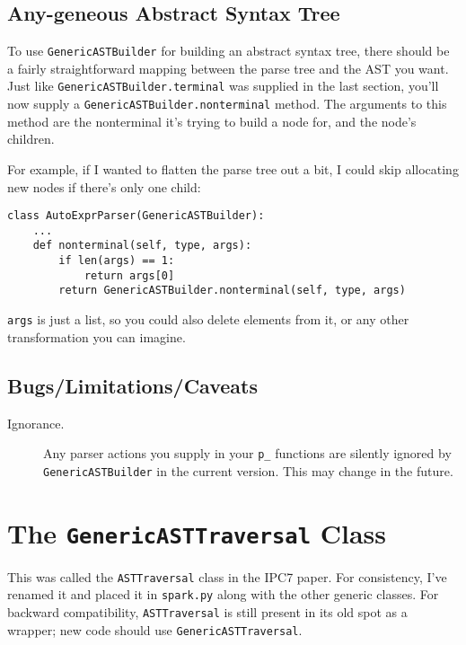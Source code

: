 \documentclass{article}
\newcommand{\code}[1]{\texttt{#1}}
\begin{document}
\subsection{Any-geneous Abstract Syntax Tree}

To use \code{GenericASTBuilder} for building an abstract syntax tree,
there should be a fairly straightforward mapping between the parse tree
and the AST you want.  Just like \code{GenericASTBuilder.terminal} was
supplied in the last section, you'll now supply a
\code{GenericASTBuilder.nonterminal} method.  The arguments to this method
are the nonterminal it's trying to build a node for, and the node's children.

For example, if I wanted to flatten the parse tree out a bit, I could
skip allocating new nodes if there's only one child:

\begin{verbatim}
class AutoExprParser(GenericASTBuilder):
    ...
    def nonterminal(self, type, args):
        if len(args) == 1:
            return args[0]
        return GenericASTBuilder.nonterminal(self, type, args)
\end{verbatim}

\code{args} is just a list, so you could also delete elements from it,
or any other transformation you can imagine.

\subsection{Bugs/Limitations/Caveats}

\begin{description}

\item[Ignorance.] Any parser actions you supply in your \code{p\_} functions are
	silently ignored by \code{GenericASTBuilder} in the current version.
	This may change in the future.

\end{description}

\section{The \code{GenericASTTraversal} Class}

This was called the \code{ASTTraversal} class in the IPC7 paper.  For
consistency, I've renamed it and placed it in \code{spark.py} along
with the other generic classes.  For backward compatibility,
\code{ASTTraversal} is still present in its old spot as a wrapper; new
code should use \code{GenericASTTraversal}.
\end{document}
